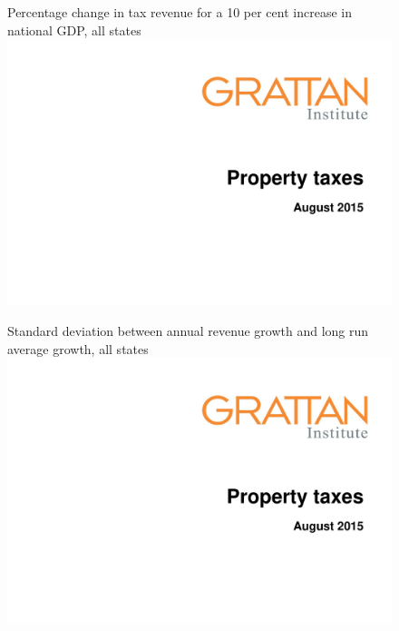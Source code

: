 \begin{subappendices}
\begin{figure}
%
{Percentage change in tax revenue for a 10 per cent increase in national GDP, all states}
\includegraphics[width=\columnwidth,page=22]{Property-taxes/atlas/PPTXProperty.pdf}
\propPhantomNotes
\end{figure}

\begin{figure}
%
{Standard deviation between annual revenue growth and long run average growth, all states}
\includegraphics[width=\columnwidth,page=23]{Property-taxes/atlas/PPTXProperty.pdf}
\propPhantomNotes
\end{figure}


\end{subappendices}

